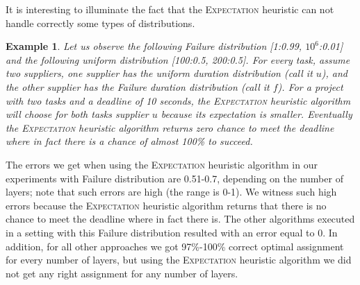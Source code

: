 \documentclass[letterpaper]{article} %
\newtheorem{example}{Example}
\newcommand{\expectation}{\textsc{Expectation}\xspace}
\begin{document}
It is interesting to illuminate the fact that the \expectation heuristic can not handle correctly some types of distributions.
\begin{example}
Let us observe the following Failure distribution [1:0.99, $10^6$:0.01] and the following uniform distribution [100:0.5, 200:0.5]. For every task, assume two suppliers, one supplier has the uniform duration distribution (call it $u$), and the other supplier has the Failure duration distribution (call it $f$). For a project with two tasks and a deadline of 10 seconds, the \expectation heuristic algorithm will choose for both tasks supplier $u$ because its expectation is smaller. Eventually the \expectation heuristic algorithm returns zero chance to meet the deadline where in fact there is a chance of almost 100\% to succeed.
\end{example}
The errors we get when using the \expectation heuristic algorithm in our experiments with Failure distribution are 0.51-0.7, depending on the number of layers; note that such errors are high (the range is 0-1). We witness such high errors because the \expectation heuristic algorithm returns that there is no chance to meet the deadline where in fact there is. The other algorithms executed in a setting with this Failure distribution resulted with an error equal to 0. In addition, for all other approaches we got 97\%-100\% correct optimal assignment for every number of layers, but using the \expectation heuristic algorithm we did not get any right assignment for any number of layers.
\end{document}

